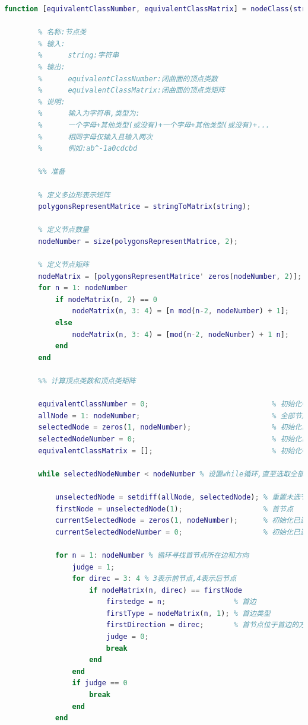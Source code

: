 \documentclass[lang = cn, scheme = chinese, thmcnt = section, usesamecnt]{elegantbook}
\begin{document}
\begin{lstlisting}[language = Matlab, caption = {节点类函数}]
	function [equivalentClassNumber, equivalentClassMatrix] = nodeClass(string)
	    
	    % 名称:节点类
	    % 输入:
	    %      string:字符串
	    % 输出:
	    %      equivalentClassNumber:闭曲面的顶点类数
	    %      equivalentClassMatrix:闭曲面的顶点类矩阵
	    % 说明:
	    %      输入为字符串,类型为:
	    %      一个字母+其他类型(或没有)+一个字母+其他类型(或没有)+...
	    %      相同字母仅输入且输入两次
	    %      例如:ab^-1a0cdcbd
	
	    %% 准备
	
	    % 定义多边形表示矩阵
	    polygonsRepresentMatrice = stringToMatrix(string);
	
	    % 定义节点数量
	    nodeNumber = size(polygonsRepresentMatrice, 2);
	    
	    % 定义节点矩阵
	    nodeMatrix = [polygonsRepresentMatrice' zeros(nodeNumber, 2)];
	    for n = 1: nodeNumber
	        if nodeMatrix(n, 2) == 0
	            nodeMatrix(n, 3: 4) = [n mod(n-2, nodeNumber) + 1];
	        else
	            nodeMatrix(n, 3: 4) = [mod(n-2, nodeNumber) + 1 n];
	        end
	    end
	    
	    %% 计算顶点类数和顶点类矩阵
	    
	    equivalentClassNumber = 0;                             % 初始化等价类数目
	    allNode = 1: nodeNumber;                               % 全部节点
	    selectedNode = zeros(1, nodeNumber);                   % 初始化已选节点
	    selectedNodeNumber = 0;                                % 初始化已选节点数目
	    equivalentClassMatrix = [];                            % 初始化等价类矩阵
	    
	    while selectedNodeNumber < nodeNumber % 设置while循环,直至选取全部节点
	    
	        unselectedNode = setdiff(allNode, selectedNode); % 重置未选节点
	        firstNode = unselectedNode(1);                   % 首节点
	        currentSelectedNode = zeros(1, nodeNumber);      % 初始化已选节点
	        currentSelectedNodeNumber = 0;                   % 初始化已选节点数目
	    
	        for n = 1: nodeNumber % 循环寻找首节点所在边和方向
	            judge = 1;
	            for direc = 3: 4 % 3表示前节点,4表示后节点
	                if nodeMatrix(n, direc) == firstNode
	                    firstedge = n;                % 首边
	                    firstType = nodeMatrix(n, 1); % 首边类型
	                    firstDirection = direc;       % 首节点位于首边的方向
	                    judge = 0;
	                    break
	                end
	            end
	            if judge == 0
	                break
	            end
	        end
	        

\end{lstlisting}
\end{document}
